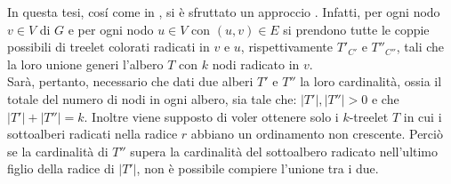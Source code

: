 In questa tesi, cos\'i come in \cite{bressan2019motivo}, si \`e sfruttato un approccio . Infatti, per ogni nodo $ v \in V $ di $ G $ e per ogni nodo $ u \in V$ con $ (u,v)\in E $ si prendono tutte le coppie possibili di treelet colorati radicati  in $ v $ e $ u $, rispettivamente $ T'_{C'} $ e $ T''_{C''} $, tali che la loro unione generi l'albero $ T $ con $ k $ nodi radicato in $ v $.\\
Sar\`a, pertanto, necessario che dati due alberi $ T' $ e $ T'' $ la loro cardinalit\`a, ossia il totale del numero di nodi in ogni albero, sia tale che: $ |T'|,|T''|>0 $ e che $ |T'| + |T''| = k $.
Inoltre viene supposto di voler ottenere solo i $ k $-treelet $ T $ in cui i sottoalberi radicati nella radice $ r $ abbiano un ordinamento non crescente.
Perci\`o se la cardinalit\`a di $ T'' $ supera la cardinalit\`a del sottoalbero radicato nell'ultimo figlio della radice di $ |T'| $, non \`e possibile compiere l'unione tra i due.

